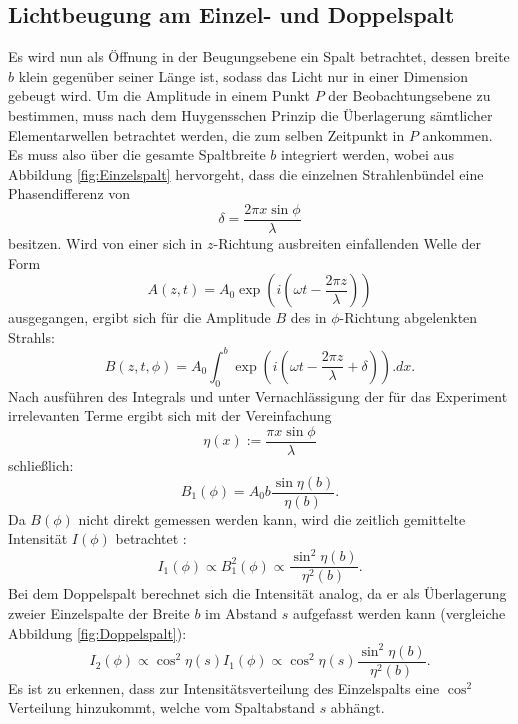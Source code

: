 \subsection{Lichtbeugung am Einzel- und Doppelspalt}

Es wird nun als Öffnung in der Beugungsebene ein Spalt betrachtet, dessen breite $b$ klein gegenüber seiner Länge ist, sodass das Licht nur in einer Dimension gebeugt wird. 
Um die Amplitude in einem Punkt $P$ der Beobachtungsebene zu bestimmen, muss nach dem Huygensschen Prinzip die Überlagerung sämtlicher Elementarwellen betrachtet werden, die zum selben Zeitpunkt in $P$ ankommen. Es muss also über die gesamte Spaltbreite $b$ integriert werden, wobei aus Abbildung \ref{fig:Einzelspalt} hervorgeht, dass die einzelnen Strahlenbündel eine Phasendifferenz von 
\[
\delta = \frac{2\pi x \sin \phi}{\lambda}
\]
besitzen. Wird von einer sich in $z$-Richtung ausbreiten einfallenden Welle der Form
\[
A(z,t) = A_0\exp \left(i\left(\omega t-\frac{2\pi z}{\lambda}\right)\right)
\]
ausgegangen, ergibt sich für die Amplitude $B$ des in $\phi$-Richtung abgelenkten Strahls:
\[
B(z,t,\phi) = A_0 \int_0^b\exp\left(i\left(\omega t-\frac{2\pi z}{\lambda}+\delta\right)\right).dx\text{.}
\]
Nach ausführen des Integrals und unter Vernachlässigung der für das Experiment irrelevanten Terme ergibt sich mit der Vereinfachung
\[
\eta(x) := \frac{\pi x \sin \phi}{\lambda}
\]
schließlich:
\[
B_1(\phi) = A_0b\frac{\sin \eta(b)}{\eta(b)}\text{.}
\]
Da $B(\phi)$ nicht direkt gemessen werden kann, wird die zeitlich gemittelte Intensität $I(\phi)$ betrachtet :
\begin{equation}
I_1(\phi)\propto B^2_1(\phi) \propto \frac{\sin^2 \eta(b)}{\eta^2(b)}\text{.} \label{eq:I1}
\end{equation}
Bei dem Doppelspalt berechnet sich die Intensität analog, da er als Überlagerung zweier Einzelspalte der Breite $b$ im Abstand $s$ aufgefasst werden kann (vergleiche Abbildung \ref{fig:Doppelspalt}):
\begin{equation}
I_2(\phi) \propto \cos^2\eta(s) I_1(\phi) \propto \cos^2\eta(s)\frac{\sin^2 \eta(b)}{\eta^2(b)}\text{.}\label{eq:I2}
\end{equation}
Es ist zu erkennen, dass zur Intensitätsverteilung des Einzelspalts eine $\cos^2$ Verteilung hinzukommt, welche vom Spaltabstand $s$ abhängt.

